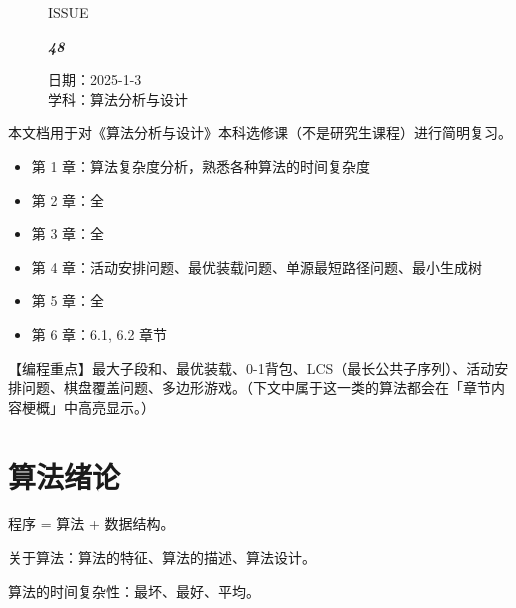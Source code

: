 \documentclass[UTF8]{ctexart}
\newcommand\Black[1]{\textcolor[gray]{0.3}{#1}}
\newcommand\Brown[1]{\textcolor[HTML]{998A4E}{#1}}
\newcommand\Emph[1]{\textcolor{cyan!80!black}{#1}}
\newcommand\IssueNumber{48}
\newcommand\Date{2025-1-3}
\newcommand\Subject{算法分析与设计}
\begin{document}
\begin{figure}[H]
\hspace{1cm}
\begin{minipage}[t]{0.3\textwidth}
\centering
    \Brown{\Genshin ISSUE}

    \vspace{-0.6cm}
    \Huge \Issue\slshape\bfseries\Black{\IssueNumber}
\end{minipage}
\hfill
\begin{minipage}[t]{0.35\textwidth}
\centering
    \Brown{日期：\Date} \\
\vspace{-0.1cm}
    \Brown{学科：\Subject} \\
\end{minipage}
\hspace{0.8cm}
\end{figure}

{\color{darkcyan}本文档用于对《算法分析与设计》本科选修课（不是研究生课程）进行简明复习。}

\begin{all-summary}
\begin{itemize}[itemsep=0pt,parsep=0pt]
  \item 第 1 章：算法复杂度分析，熟悉各种算法的时间复杂度
  \item 第 2 章：全
  \item 第 3 章：全
  \item 第 4 章：活动安排问题、最优装载问题、单源最短路径问题、最小生成树
  \item 第 5 章：全
  \item 第 6 章：6.1, 6.2 章节
\end{itemize}

【编程重点】最大子段和、最优装载、0-1背包、LCS（最长公共子序列）、活动安排问题、棋盘覆盖问题、多边形游戏。（下文中属于这一类的算法都会在「章节内容梗概」中\Emph{高亮}显示。）
\end{all-summary}

\section{算法绪论}
程序 = 算法 + 数据结构。

关于算法：算法的特征、算法的描述、算法设计。

算法的时间复杂性：最坏、最好、平均。
\end{document}
